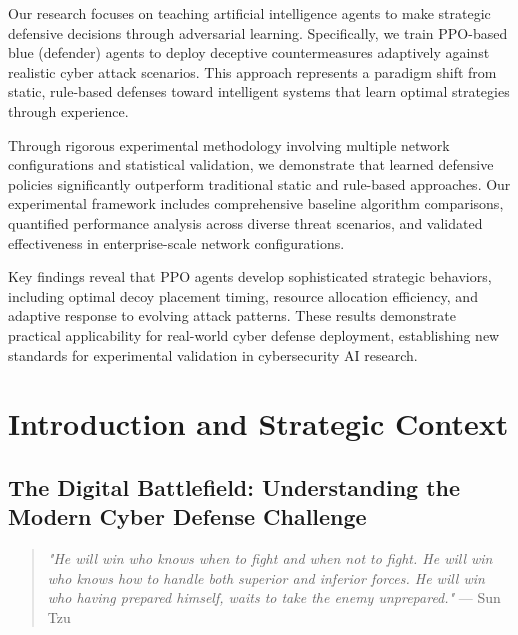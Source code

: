 \documentclass[12pt,twoside]{article}
\theoremstyle{definition}
\theoremstyle{plain}
\begin{document}
Our research focuses on teaching artificial intelligence agents to make strategic defensive decisions through adversarial learning. Specifically, we train PPO-based blue (defender) agents \citep{schulman2017proximal} to deploy deceptive countermeasures adaptively against realistic cyber attack scenarios. This approach represents a paradigm shift from static, rule-based defenses toward intelligent systems that learn optimal strategies through experience.

Through rigorous experimental methodology involving multiple network configurations and statistical validation, we demonstrate that learned defensive policies significantly outperform traditional static and rule-based approaches. Our experimental framework includes comprehensive baseline algorithm comparisons, quantified performance analysis across diverse threat scenarios, and validated effectiveness in enterprise-scale network configurations.

Key findings reveal that PPO agents develop sophisticated strategic behaviors, including optimal decoy placement timing, resource allocation efficiency, and adaptive response to evolving attack patterns. These results demonstrate practical applicability for real-world cyber defense deployment, establishing new standards for experimental validation in cybersecurity AI research.

\clearpage

\setcounter{page}{1}
\pagestyle{fancy}
\fancyhf{}
\fancyfoot[C]{\thepage}

\clearpage

\section{Introduction and Strategic Context}

\subsection{The Digital Battlefield: Understanding the Modern Cyber Defense Challenge}

\begin{quotation}
\textit{"He will win who knows when to fight and when not to fight. He will win who knows how to handle both superior and inferior forces. He will win who having prepared himself, waits to take the enemy unprepared."} — Sun Tzu \citep{tzu2005art}
\end{quotation}
\end{document}
